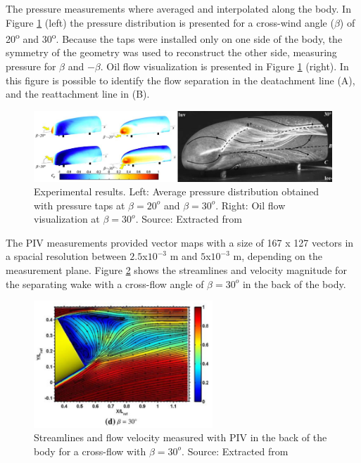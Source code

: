 \documentclass[journal]{new-aiaa}
\begin{document}
The pressure measurements where averaged and interpolated along the body. In Figure \ref{fig:ExpResults} (left) the pressure distribution is presented for a cross-wind angle ($\beta$) of 20\textsuperscript{o} and 30\textsuperscript{o}. Because the taps were installed only on one side of the body, the symmetry of the geometry was used to reconstruct the other side, measuring pressure for $\beta$ and $-\beta$. Oil flow visualization is presented in Figure \ref{fig:ExpResults} (right). In this figure is possible to identify the flow separation in the deatachment line (A), and the reattachment line in (B). 



\begin{figure}[H]
\begin{center}
\includegraphics[width=1\textwidth]{Images/federico/Figure11}
\caption{Experimental results. Left: Average pressure distribution obtained with pressure taps at $\beta = 20^o$ and $\beta = 30^o$. Right: Oil flow visualization at $\beta = 30^o$. Source: Extracted from \cite{Gohlke2007}}
\label{fig:ExpResults}
\end{center}
\end{figure}

The PIV measurements provided vector maps with a size of 167 x 127 vectors in a spacial resolution between $2.5$x$10^{-3}$ m and $5$x$10^{-3}$ m, depending on the measurement plane. Figure \ref{fig:ExpResults2} shows the  streamlines and velocity magnitude for the separating wake with a cross-flow angle of $\beta = 30^o$ in the back of the body. 


\begin{figure}[H]
\begin{center}
\includegraphics[width=0.6\textwidth]{Images/federico/Figure12}
\caption{Streamlines and flow velocity measured with PIV in the back of the body for a cross-flow with $\beta = 30^o$. Source: Extracted from \cite{Gohlke2007}}
\label{fig:ExpResults2}
\end{center}
\end{figure}
\end{document}
